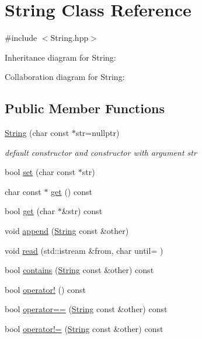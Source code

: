 \hypertarget{classString}{}\section{String Class Reference}
\label{classString}


{\ttfamily \#include $<$String.\+hpp$>$}



Inheritance diagram for String\+:


Collaboration diagram for String\+:
\subsection*{Public Member Functions}
\begin{DoxyCompactItemize}
\item 
\hyperlink{classString_a33582c77a4e6b03f950082593cc57de4}{String} (char const $\ast$str=nullptr)
\begin{DoxyCompactList}\small\item\em default constructor and constructor with argument str \end{DoxyCompactList}\item 
bool \hyperlink{classString_a809addfc91485db4c89baad03ff12b18}{set} (char const $\ast$str)
\item 
char const  $\ast$ \hyperlink{classString_ac7459c7a9d75bdcc53d44a0c5ec7a182}{get} () const
\item 
bool \hyperlink{classString_ad11aaf7841686006dd6840a5fab5664e}{get} (char $\ast$\&str) const
\item 
void \hyperlink{classString_a8a191fafb7af689d86f50423e97e60d7}{append} (\hyperlink{classString}{String} const \&other)
\item 
void \hyperlink{classString_ab0c13e38cf91f55bb6eaedd513f124db}{read} (std\+::istream \&from, char until=\textquotesingle{} \textquotesingle{})
\item 
bool \hyperlink{classString_a16b809e6c0a80889b2ee8e753003ab70}{contains} (\hyperlink{classString}{String} const \&other) const
\item 
bool \hyperlink{classString_a3a8304a7fe06a23f1750629a9186d346}{operator!} () const
\item 
bool \hyperlink{classString_a2525ca0e0fd8e1a63d947f39ebc5e4d0}{operator==} (\hyperlink{classString}{String} const \&other) const
\item 
bool \hyperlink{classString_abfb25af8317420d71b0d54603d049383}{operator!=} (\hyperlink{classString}{String} const \&other) const

\end{DoxyCompactItemize}
